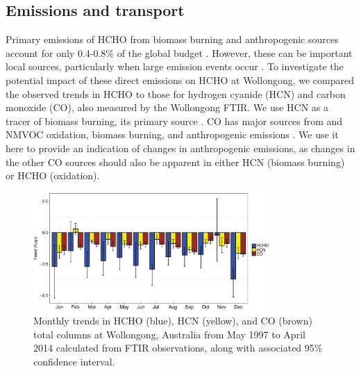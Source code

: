 \documentclass[draft,linenumbers]{AGUJournal}
\begin{document}
\subsection{Emissions and transport}
Primary emissions of HCHO from biomass burning and anthropogenic sources account for only 0.4-0.8\% of the global budget \citep{Pfister2008,Fortems2012,Zeng2015}. However, these can be important local sources, particularly when large emission events occur \citep{Stavrakou2009}. To investigate the potential impact of these direct emissions on HCHO at Wollongong, we compared the observed  trends in HCHO to those for hydrogen cyanide (HCN) and carbon monoxide (CO), also measured by the Wollongong FTIR. We use HCN as a tracer of biomass burning, its primary source \citep{Li2000,Li2003,Li2009}. CO has major sources from  and NMVOC oxidation, biomass burning, and anthropogenic emissions \citep{Zeng2015,Fisher2015,Yin2015}. We use it here to provide an indication of changes in anthropogenic emissions, as changes in the other CO sources should also be apparent in either HCN (biomass burning) or HCHO (oxidation).

\begin{figure}[h!]
  \begin{center}
    \includegraphics[width=0.8\textwidth]{all_tg_monthly_trends_wollongong}
      \caption{Monthly trends in HCHO (blue), HCN (yellow), and CO (brown) total columns at Wollongong, Australia from May 1997 to April 2014 calculated from FTIR observations, along with associated 95\% confidence interval.}
  \label{fig:alltg_trends}
  \end{center}
\end{figure}
\end{document}
